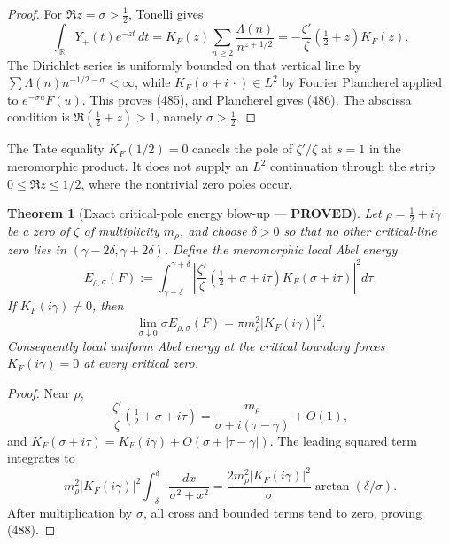 \documentclass[11pt]{article}
\newtheorem{theorem}{Theorem}
\newcommand{\PROVED}{\textcolor{green!45!black}{\textbf{PROVED}}}
\begin{document}
\begin{proof}
For \(\Re z=\sigma>\frac12\), Tonelli gives
\[
 \int_{\mathbb R}Y_+(t)e^{-zt}\,dt
 =K_F(z)\sum_{n\ge2}\frac{\Lambda(n)}{n^{z+1/2}}
 =-\frac{\zeta'}{\zeta}(\tfrac12+z)K_F(z).
\]
The Dirichlet series is uniformly bounded on that vertical line by
\(\sum\Lambda(n)n^{-1/2-\sigma}<\infty\), while
\(K_F(\sigma+i\,\cdot)\in L^2\) by Fourier Plancherel applied to
\(e^{-\sigma u}F(u)\).  This proves (485), and Plancherel gives (486).
The abscissa condition is \(\Re(\frac12+z)>1\), namely
\(\sigma>\frac12\).
\end{proof}

The Tate equality \(K_F(1/2)=0\) cancels the pole of
\(\zeta'/\zeta\) at \(s=1\) in the meromorphic product.  It does not supply
an \(L^2\) continuation through the strip
\(0\le\Re z\le1/2\), where the nontrivial zero poles occur.

\begin{theorem}[Exact critical-pole energy blow-up --- \PROVED]
Let \(\rho=\frac12+i\gamma\) be a zero of \(\zeta\) of multiplicity
\(m_\rho\), and choose \(\delta>0\) so that no other critical-line zero
lies in \((\gamma-2\delta,\gamma+2\delta)\).  Define the meromorphic local
Abel energy
\begin{equation}
 E_{\rho,\sigma}(F):=
 \int_{\gamma-\delta}^{\gamma+\delta}
 \left|\frac{\zeta'}{\zeta}
 (\tfrac12+\sigma+i\tau)K_F(\sigma+i\tau)\right|^2d\tau.       \tag{487}
\end{equation}
If \(K_F(i\gamma)\ne0\), then
\begin{equation}
 \boxed{
 \lim_{\sigma\downarrow0}\sigma E_{\rho,\sigma}(F)
 =\pi m_\rho^2|K_F(i\gamma)|^2.}                    \tag{488}
\end{equation}
Consequently local uniform Abel energy at the critical boundary forces
\(K_F(i\gamma)=0\) at every critical zero.
\end{theorem}

\begin{proof}
Near \(\rho\),
\[
 \frac{\zeta'}{\zeta}(\tfrac12+\sigma+i\tau)
 =\frac{m_\rho}{\sigma+i(\tau-\gamma)}+O(1),
\]
and \(K_F(\sigma+i\tau)=K_F(i\gamma)+O(\sigma+|\tau-\gamma|)\).
The leading squared term integrates to
\[
 m_\rho^2|K_F(i\gamma)|^2
 \int_{-\delta}^{\delta}\frac{dx}{\sigma^2+x^2}
 =\frac{2m_\rho^2|K_F(i\gamma)|^2}{\sigma}
   \arctan(\delta/\sigma).
\]
After multiplication by \(\sigma\), all cross and bounded terms tend to
zero, proving (488).
\end{proof}
\end{document}
